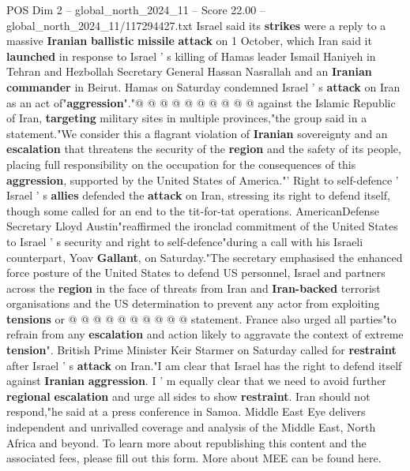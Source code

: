 \begin{textsample}{POS Dim 2 – global\_north\_2024\_11 – Score 22.00 – global\_north\_2024\_11/117294427.txt}
Israel said its \textbf{strikes} were a reply to a massive \textbf{Iranian} \textbf{ballistic} \textbf{missile} \textbf{attack} on 1 October, which Iran said it \textbf{launched} in response to Israel ' s killing of Hamas leader Ismail Haniyeh in Tehran and Hezbollah Secretary General Hassan Nasrallah and an \textbf{Iranian} \textbf{commander} in Beirut.
Hamas on Saturday condemned Israel ' s \textbf{attack} on Iran as an act of"\textbf{aggression}"."@ @ @ @ @ @ @ @ @ @ against the Islamic Republic of Iran, \textbf{targeting} military sites in multiple provinces,"the group said in a statement."We consider this a flagrant violation of \textbf{Iranian} sovereignty and an \textbf{escalation} that threatens the security of the \textbf{region} and the safety of its people, placing full responsibility on the occupation for the consequences of this \textbf{aggression}, supported by the United States of America."' Right to self-defence ' Israel ' s \textbf{allies} defended the \textbf{attack} on Iran, stressing its right to defend itself, though some called for an end to the tit-for-tat operations.
AmericanDefense Secretary Lloyd Austin"reaffirmed the ironclad commitment of the United States to Israel ' s security and right to self-defence"during a call with his Israeli counterpart, Yoav \textbf{Gallant}, on Saturday."The secretary emphasised the enhanced force posture of the United States to defend US personnel, Israel and partners across the \textbf{region} in the face of threats from Iran and \textbf{Iran-backed} terrorist organisations and the US determination to prevent any actor from exploiting \textbf{tensions} or @ @ @ @ @ @ @ @ @ @ statement.
France also urged all parties"to refrain from any \textbf{escalation} and action likely to aggravate the context of extreme \textbf{tension}".
British Prime Minister Keir Starmer on Saturday called for \textbf{restraint} after Israel ' s \textbf{attack} on Iran."I am clear that Israel has the right to defend itself against \textbf{Iranian} \textbf{aggression}.
I ' m equally clear that we need to avoid further \textbf{regional} \textbf{escalation} and urge all sides to show \textbf{restraint}.
Iran should not respond,"he said at a press conference in Samoa.
Middle East Eye delivers independent and unrivalled coverage and analysis of the Middle East, North Africa and beyond.
To learn more about republishing this content and the associated fees, please fill out this form.
More about MEE can be found here.

\end{textsample}
